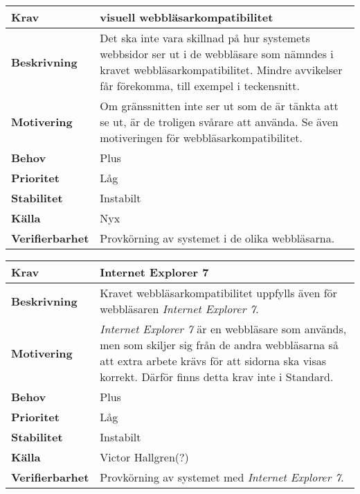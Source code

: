 \documentclass[a4paper, twoside, 11pt, titlepage]{article}
\begin{document}
		\begin{tabular} { p{2.6cm} p{12.5cm} }
			\hline
			\sffamily\textbf{Krav} & visuell webbläsarkompatibilitet  \\
			\hline
			\sffamily\textbf{Beskrivning} & Det ska inte vara skillnad på hur systemets webbsidor ser ut i de webbläsare som nämndes i kravet webbläsarkompatibilitet. Mindre avvikelser får förekomma, till exempel i teckensnitt.  \\
			\hline
			\sffamily\textbf{Motivering} & Om gränssnitten inte ser ut som de är tänkta att se ut, är de troligen svårare att använda. Se även motiveringen för webbläsarkompatibilitet.  \\
			\hline
			\sffamily\textbf{Behov} & Plus  \\
			\hline
			\sffamily\textbf{Prioritet} & Låg  \\
			\hline
			\sffamily\textbf{Stabilitet} & Instabilt  \\
			\hline
			\sffamily\textbf{Källa} & Nyx  \\
			\hline
			\sffamily\textbf{Verifierbarhet} & Provkörning av systemet i de olika webbläsarna.  \\
			\hline
		\end{tabular}
		\vspace{6mm}

		\begin{tabular} { p{2.6cm} p{12.5cm} }
			\hline
			\sffamily\textbf{Krav} & Internet Explorer 7  \\
			\hline
			\sffamily\textbf{Beskrivning} & Kravet webbläsarkompatibilitet uppfylls även för webbläsaren \emph{Internet Explorer 7}.  \\
			\hline
			\sffamily\textbf{Motivering} &  \emph{Internet Explorer 7} är en webbläsare som används, men som skiljer sig från de andra webbläsarna så att extra arbete krävs för att sidorna ska visas korrekt. Därför finns detta krav inte i Standard.  \\
			\hline
			\sffamily\textbf{Behov} & Plus  \\
			\hline
			\sffamily\textbf{Prioritet} & Låg  \\
			\hline
			\sffamily\textbf{Stabilitet} & Instabilt  \\
			\hline
			\sffamily\textbf{Källa} & Victor Hallgren(?)  \\
			\hline
			\sffamily\textbf{Verifierbarhet} & Provkörning av systemet med \emph{Internet Explorer 7}.  \\
			\hline
		\end{tabular}
\end{document}
